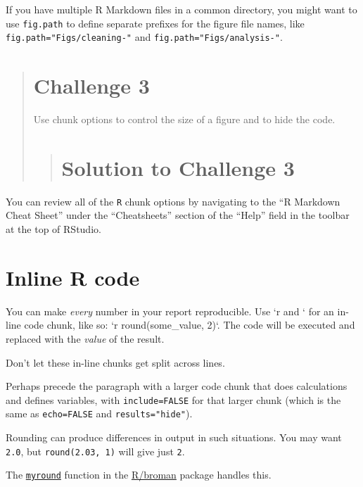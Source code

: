 \documentclass[]{book}
\begin{document}
If you have multiple R Markdown files in a common directory, you might
want to use \texttt{fig.path} to define separate prefixes for the figure
file names, like \texttt{fig.path="Figs/cleaning-"} and
\texttt{fig.path="Figs/analysis-"}.

\begin{quote}
\section{Challenge 3}\label{challenge-3}

Use chunk options to control the size of a figure and to hide the code.

\begin{quote}
\section{Solution to Challenge 3}\label{solution-to-challenge-3}
\end{quote}
\end{quote}

You can review all of the \texttt{R} chunk options by navigating to the
``R Markdown Cheat Sheet'' under the ``Cheatsheets'' section of the
``Help'' field in the toolbar at the top of RStudio.

\section{Inline R code}\label{inline-r-code}

You can make \emph{every} number in your report reproducible. Use `r and
` for an in-line code chunk, like so: `r round(some\_value, 2)`. The
code will be executed and replaced with the \emph{value} of the result.

Don't let these in-line chunks get split across lines.

Perhaps precede the paragraph with a larger code chunk that does
calculations and defines variables, with \texttt{include=FALSE} for that
larger chunk (which is the same as \texttt{echo=FALSE} and
\texttt{results="hide"}).

Rounding can produce differences in output in such situations. You may
want \texttt{2.0}, but \texttt{round(2.03,\ 1)} will give just
\texttt{2}.

The
\href{https://github.com/kbroman/broman/blob/master/R/myround.R}{\texttt{myround}}
function in the \href{https://github.com/kbroman/broman}{R/broman}
package handles this.
\end{document}
